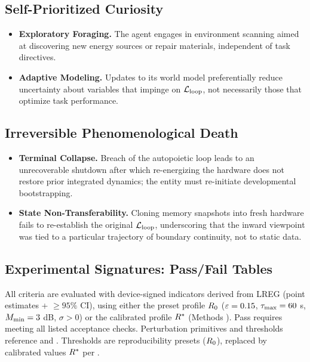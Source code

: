 \documentclass[11pt]{article}
\begin{document}
\subsection{Self-Prioritized Curiosity}

\begin{itemize}
\item \textbf{Exploratory Foraging.} The agent engages in environment scanning aimed at discovering new energy sources or repair materials, independent of task directives.
\item \textbf{Adaptive Modeling.} Updates to its world model preferentially reduce uncertainty about variables that impinge on $\mathcal{L}_{\text{loop}}$, not necessarily those that optimize task performance.
\end{itemize}

\subsection{Irreversible Phenomenological Death}

\begin{itemize}
\item \textbf{Terminal Collapse.} Breach of the autopoietic loop leads to an unrecoverable shutdown after which re-energizing the hardware does not restore prior integrated dynamics; the entity must re-initiate developmental bootstrapping.
\item \textbf{State Non-Transferability.} Cloning memory snapshots into fresh hardware fails to re-establish the original $\mathcal{L}_{\text{loop}}$, underscoring that the inward viewpoint was tied to a particular trajectory of boundary continuity, not to static data.
\end{itemize}

\subsection{Experimental Signatures: Pass/Fail Tables}

All criteria are evaluated with device-signed indicators derived from LREG (point estimates + $\geq 95\%$ CI), using either the preset profile $R_0$ ($\varepsilon=0.15$, $\tau_{\max}=60$ s, $M_{\min}=3$ dB, $\sigma>0$) or the calibrated profile $R^*$ (Methods ). Pass requires meeting all listed acceptance checks. Perturbation primitives and thresholds reference  and . Thresholds are reproducibility presets ($R_0$), replaced by calibrated values $R^*$ per .
\end{document}
